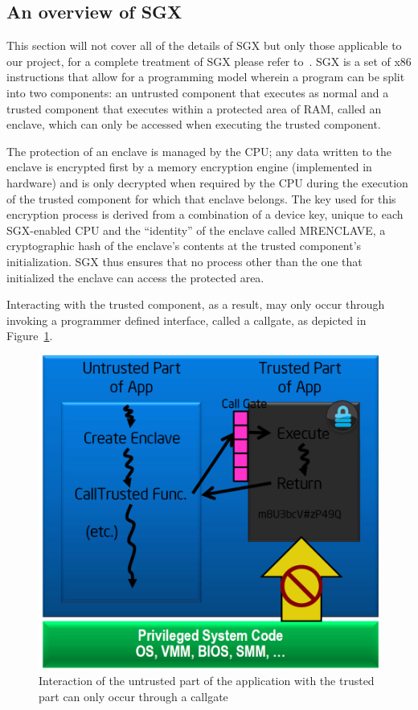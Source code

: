 \documentclass[../main.tex]{subfiles}
\begin{document}
	
\subsection{An overview of \Intel SGX} 
This section will not cover all of the details of SGX but only those applicable to our project, for a complete treatment of SGX please refer to~\cite{IntelCorporation2010}. \Intel SGX is a set of x86 instructions that allow for a programming model wherein a program can be split into two components: an untrusted component that executes as normal and a trusted component that executes within a protected area of RAM, called an enclave, which can only be accessed when executing the trusted component. 

The protection of an enclave is managed by the CPU; any data written to the enclave is encrypted first by a memory encryption engine (implemented in hardware) and is only decrypted when required by the CPU during the execution of the trusted component for which that enclave belongs. The key used for this encryption process is derived from a combination of a device key, unique to each SGX-enabled CPU and the ``identity'' of the enclave called MRENCLAVE, a cryptographic hash of the enclave's contents at the trusted component's initialization. SGX thus ensures that no process other than the one that initialized the enclave can access the protected area. 

Interacting with the trusted component, as a result, may only occur through invoking a programmer defined interface, called a callgate, as depicted in Figure~\ref{fig:sgxhighlevel}.

\begin{figure}[H]
	\centering
	\includegraphics[scale=0.25]{images/sgxhighlevel.png}
	\caption{Interaction of the untrusted part of the application with the trusted part can only occur through a callgate}
	\label{fig:sgxhighlevel}
\end{figure}
\end{document}

